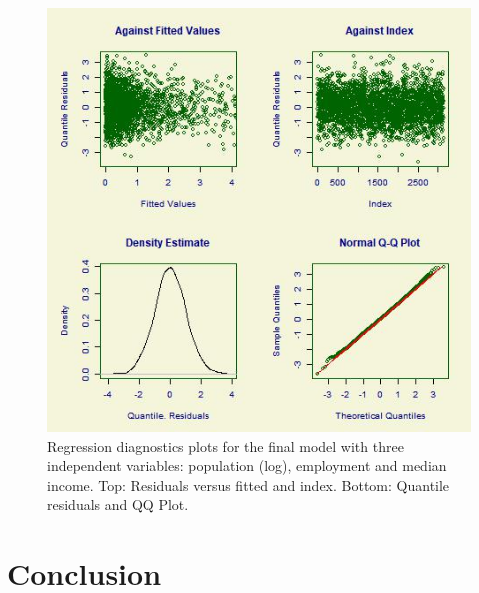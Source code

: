 \documentclass[sigconf]{acmart}
\begin{document}
\begin{figure}
\includegraphics[width=1.0\textwidth]{images/figure3.jpg}
\caption{Regression diagnostics plots for the final model with three independent variables: population (log), employment and median income. Top: Residuals versus fitted and index.  Bottom: Quantile residuals and QQ Plot. }
\end{figure}


\section{Conclusion}

 
\end{document}
